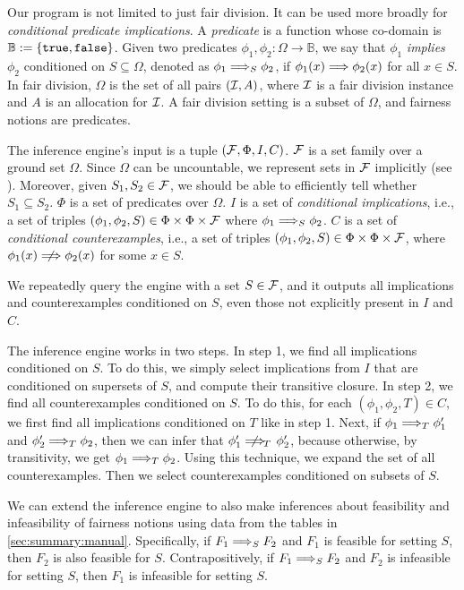 Our program is not limited to just fair division.
It can be used more broadly for \emph{conditional predicate implications}.
A \emph{predicate} is a function whose co-domain is $\mathbb{B} := \{\mathtt{true}, \mathtt{false}\}$.
Given two predicates $\phi_1, \phi_2: \Omega \to \mathbb{B}$,
we say that $\phi_1$ \emph{implies} $\phi_2$ conditioned on $S \subseteq \Omega$,
denoted as $\phi_1 \Longrightarrow_S \phi_2$,
if $\phi_1(x) \Longrightarrow \phi_2(x)$ for all $x \in S$.
In fair division, $\Omega$ is the set of all pairs $(\mathcal{I}, A)$,
where $\mathcal{I}$ is a fair division instance and $A$ is an allocation for $\mathcal{I}$.
A fair division setting is a subset of $\Omega$,
and fairness notions are predicates.

The inference engine's input is a tuple $(\mathcal{F}, \Phi, I, C)$.
$\mathcal{F}$ is a set family over a ground set $\Omega$.
    Since $\Omega$ can be uncountable, we represent sets in $\mathcal{F}$ implicitly
    (see ).
    Moreover, given $S_1, S_2 \in \mathcal{F}$, we should be able to efficiently tell whether $S_1 \subseteq S_2$.
$\Phi$ is a set of predicates over $\Omega$.
$I$ is a set of \emph{conditional implications}, i.e., a set of triples
    $(\phi_1, \phi_2, S) \in \Phi \times \Phi \times \mathcal{F}$
    where $\phi_1 \Longrightarrow_S \phi_2$.
$C$ is a set of \emph{conditional counterexamples}, i.e., a set of triples
    $(\phi_1, \phi_2, S) \in \Phi \times \Phi \times \mathcal{F}$,
    where $\phi_1(x) \nfimplies \phi_2(x)$ for some $x \in S$.

We repeatedly query the engine with a set $S \in \mathcal{F}$,
and it outputs all implications and counterexamples conditioned on $S$,
even those not explicitly present in $I$ and $C$.

The inference engine works in two steps.
In step 1, we find all implications conditioned on $S$.
To do this, we simply select implications from $I$ that are conditioned on
supersets of $S$, and compute their transitive closure.
In step 2, we find all counterexamples conditioned on $S$.
To do this, for each $(\phi_1, \phi_2, T) \in C$,
we first find all implications conditioned on $T$ like in step 1.
Next, if $\phi_1 \Longrightarrow_T \phi'_1$ and $\phi'_2 \Longrightarrow_T \phi_2$,
then we can infer that $\phi'_1 \nfimplies_{\!\!\!T\,\,\,} \phi'_2$, because otherwise,
by transitivity, we get $\phi_1 \Longrightarrow_T \phi_2$.
Using this technique, we expand the set of all counterexamples.
Then we select counterexamples conditioned on subsets of $S$.

We can extend the inference engine to also make inferences about
feasibility and infeasibility of fairness notions using data from the tables in \cref{sec:summary:manual}.
Specifically, if $F_1 \Longrightarrow_S F_2$ and $F_1$ is feasible for setting $S$,
then $F_2$ is also feasible for $S$.
Contrapositively, if $F_1 \Longrightarrow_S F_2$ and $F_2$ is infeasible for setting $S$,
then $F_1$ is infeasible for setting $S$.
